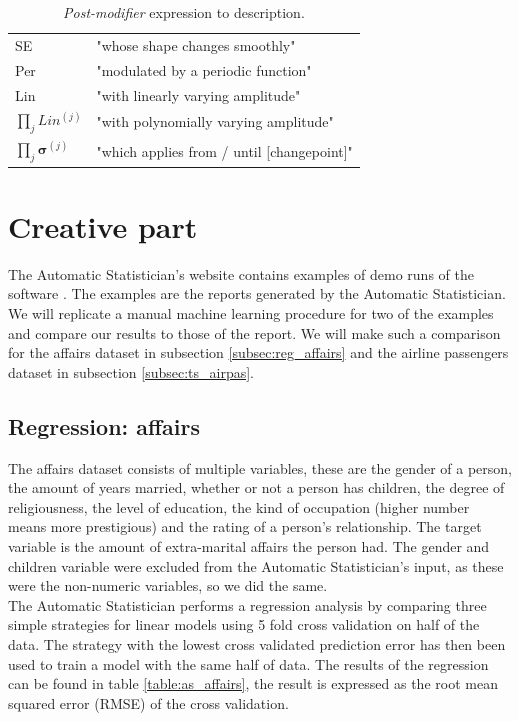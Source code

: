 \documentclass[a4paper, 10pt, conference]{ieeeconf}
\begin{document}
\begin{table}[!ht]
    \centering
    \begin{tabular}{ll}
        SE                                  & "whose shape changes smoothly"                 \\
        Per                                 & "modulated by a periodic function"             \\
        Lin                                 & "with linearly varying amplitude"              \\
        $\prod_j Lin^{(j)}$                 & "with polynomially varying amplitude"          \\
        $\prod_j \boldsymbol{\sigma}^{(j)}$ & "which applies from / until [changepoint]"
    \end{tabular}
    \caption{\textit{Post-modifier} expression to description.}
    \label{tab:postmodifiertostring}
\end{table}

\section{Creative part}
The Automatic Statistician's website contains examples of demo runs of the software \cite{as_examples}. The examples are the reports generated by the Automatic Statistician. We will replicate a manual machine learning procedure for two of the examples and compare our results to those of the report. We will make such a comparison for the affairs dataset \cite{doi:10.1086/260646} in subsection \ref{subsec:reg_affairs} and the airline passengers dataset \cite{airpax_dataset} in subsection \ref{subsec:ts_airpas}.

\subsection{Regression: affairs}
The affairs dataset consists of multiple variables, these are the gender of a person, the amount of years married, whether or not a person has children, the degree of religiousness, the level of education, the kind of occupation (higher number means more prestigious) and the rating of a person's relationship. The target variable is the amount of extra-marital affairs the person had. The gender and children variable were excluded from the Automatic Statistician's input, as these were the non-numeric variables, so we did the same.\\

The Automatic Statistician performs a regression analysis by comparing three simple strategies for linear models using 5 fold cross validation on half of the data. The strategy with the lowest cross validated prediction error has then been used to train a model with the same half of data. The results of the regression can be found in table \ref{table:as_affairs}, the result is expressed as the root mean squared error (RMSE) of the cross validation.
\end{document}
